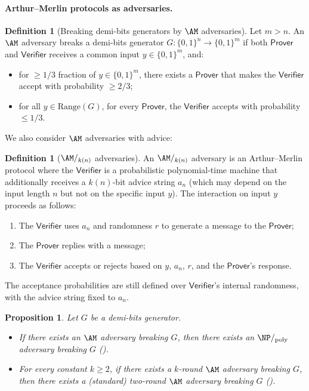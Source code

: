 \documentclass[10pt,a4paper]{article}
\newtheorem{proposition}[theorem]{Proposition}
\theoremstyle{definition}
\newtheorem{definition}[theorem]{Definition}
\theoremstyle{remark}
\renewcommand{\poly}{\mathrm{poly}}
\newcommand{\Range}{\mathrm{Range}}
\newcommand{\Prover}{\mathsf{Prover}}
\newcommand{\Verifier}{\mathsf{Verifier}}
\newenvironment{compactenum}{\begin{enumerate}}{\end{enumerate}}
\begin{document}
\paragraph{Arthur--Merlin protocols as adversaries.}

\begin{definition}[Breaking demi-bits generators by $\AM$ adversaries]
    Let $m > n$. An $\AM$ adversary breaks a demi-bits generator $G:\{0, 1\}^n \to \{0, 1\}^m$ if both $\Prover$ and $\Verifier$ receives a common input $y\in\{0, 1\}^m$, and:
    \begin{itemize}
        \item for $\ge 1/3$ fraction of $y\in \{0, 1\}^m$, there exists a $\Prover$ that makes the $\Verifier$ accept with probability $\ge 2/3$;
        \item for all $y\in \Range(G)$, for every $\Prover$, the $\Verifier$ accepts with probability $\le 1/3$.
    \end{itemize}
\end{definition}

We also consider $\AM$ adversaries with advice:

\begin{definition}[$\AM/_{k(n)}$ adversaries]
    An $\AM/_{k(n)}$ adversary is an Arthur--Merlin protocol where the $\Verifier$ is a probabilistic polynomial-time machine that additionally receives a $k(n)$-bit advice string $a_n$ (which may depend on the input length $n$ but not on the specific input $y$). The interaction on input $y$ proceeds as follows:
    \begin{compactenum}
        \item The $\Verifier$ uses $a_n$ and randomness $r$ to generate a message to the $\Prover$;
        \item The $\Prover$ replies with a message;
        \item The $\Verifier$ accepts or rejects based on $y$, $a_n$, $r$, and the $\Prover$'s response.
    \end{compactenum}
    The acceptance probabilities are still defined over $\Verifier$'s internal randomness, with the advice string fixed to $a_n$.
\end{definition}


\begin{proposition}
    Let $G$ be a demi-bits generator.
    \begin{itemize}
        \item If there exists an $\AM$ adversary breaking $G$, then there exists an $\NP/_{\poly}$ adversary breaking $G$ \textnormal{(\cite{Adleman78})}.
        \item For every constant $k\ge 2$, if there exists a $k$-round $\AM$ adversary breaking $G$, then there exists a (standard) two-round $\AM$ adversary breaking $G$ \textnormal{(\cite{Babai85})}.
    \end{itemize}
\end{proposition}
\end{document}
